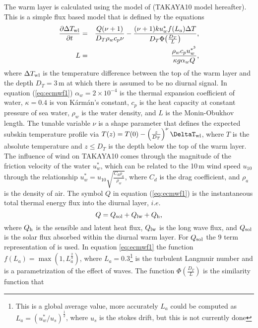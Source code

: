 \documentclass[../tex_main/NEMO_manual]{subfiles}
\begin{document}
The warm layer is calculated using the model of \citet{Takaya_al_JGR10} (TAKAYA10 model hereafter).
This is a simple flux based model that is defined by the equations
\begin{align}
\frac{\partial{\Delta T_{\rm{wl}}}}{\partial{t}}&=&\frac{Q(\nu+1)}{D_T\rho_w c_p
\nu}-\frac{(\nu+1)ku^*_{w}f(L_a)\Delta T}{D_T\Phi\!\left(\frac{D_T}{L}\right)} \mbox{,}
\label{eq:ecmwf1} \\
L&=&\frac{\rho_w c_p u^{*^3}_{w}}{\kappa g \alpha_w Q }\mbox{,}\label{eq:ecmwf2}
\end{align}
where $\Delta T_{\rm{wl}}$ is the temperature difference between the top of the warm layer and the depth $D_T=3$\,m at which there is assumed to be no diurnal signal.
In equation (\autoref{eq:ecmwf1}) $\alpha_w=2\times10^{-4}$ is the thermal expansion coefficient of water,
$\kappa=0.4$ is von K\'{a}rm\'{a}n's constant, $c_p$ is the heat capacity at constant pressure of sea water,
$\rho_w$ is the water density, and $L$ is the Monin-Obukhov length.
The tunable variable $\nu$ is a shape parameter that defines the expected subskin temperature profile via
$T(z)=T(0)-\left(\frac{z}{D_T}\right)^\nu\DeltaT_{\rm{wl}}$,
where $T$ is the absolute temperature and $z\le D_T$ is the depth below the top of the warm layer.
The influence of wind on TAKAYA10 comes through the magnitude of the friction velocity of the water $u^*_{w}$,
which can be related to the 10\,m wind speed $u_{10}$ through
the relationship $u^*_{w} = u_{10}\sqrt{\frac{C_d\rho_a}{\rho_w}}$, where $C_d$ is the drag coefficient,
and $\rho_a$ is the density of air.
The symbol $Q$ in equation (\autoref{eq:ecmwf1}) is the instantaneous total thermal energy flux into
the diurnal layer, $i.e.$
\begin{equation}
Q = Q_{\rm{sol}} + Q_{\rm{lw}} + Q_{\rm{h}}\mbox{,} \label{eq:e_flux_eqn}
\end{equation}
where $Q_{\rm{h}}$ is the sensible and latent heat flux, $Q_{\rm{lw}}$ is the long wave flux,
and $Q_{\rm{sol}}$ is the solar flux absorbed within the diurnal warm layer.
For $Q_{\rm{sol}}$ the 9 term representation of \citet{Gentemann_al_JGR09} is used.
In equation \autoref{eq:ecmwf1} the function $f(L_a)=\max(1,L_a^{\frac{2}{3}})$,
where $L_a=0.3$\footnote{
  This is a global average value, more accurately $L_a$ could be computed as $L_a=(u^*_{w}/u_s)^{\frac{1}{2}}$,
  where $u_s$ is the stokes drift, but this is not currently done
} is the turbulent Langmuir number and is a parametrization of the effect of waves.
The function $\Phi\!\left(\frac{D_T}{L}\right)$ is the similarity function that
\end{document}

